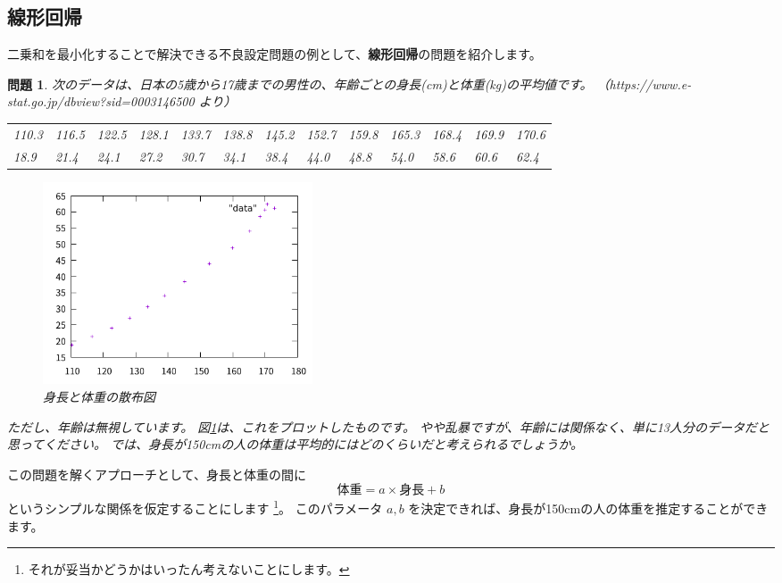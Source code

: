 \documentclass[uplatex,dvipdfmx]{jsarticle}
\newtheorem{prob}[thm]{問題}
\begin{document}
\subsection{線形回帰}
  二乗和を最小化することで解決できる不良設定問題の例として、\textbf{線形回帰}の問題を紹介します。
  \begin{prob}
    \label{prob:linear-regression}
    次のデータは、日本の5歳から17歳までの男性の、年齢ごとの身長(cm)と体重(kg)の平均値です。
    （https://www.e-stat.go.jp/dbview?sid=0003146500 より）

    \begin{table}[htb]
      \begin{tabular}{lllllllllllll}
        110.3 & 116.5 & 122.5 & 128.1 & 133.7 & 138.8 & 145.2 & 152.7 & 159.8 & 165.3 & 168.4 & 169.9 & 170.6 \\
        18.9 & 21.4 & 24.1 & 27.2 & 30.7 & 34.1 & 38.4 & 44.0 & 48.8 & 54.0 & 58.6 & 60.6 & 62.4
      \end{tabular}
    \end{table}

    \begin{figure}
      \centering
      \includegraphics[width=8cm]{scatter1.png}
      \caption{身長と体重の散布図}
      \label{scatter1}
    \end{figure}

    ただし、年齢は無視しています。
    図\ref{scatter1}は、これをプロットしたものです。
    やや乱暴ですが、年齢には関係なく、単に13人分のデータだと思ってください。
    では、身長が150cmの人の体重は平均的にはどのくらいだと考えられるでしょうか。
  \end{prob}

  この問題を解くアプローチとして、身長と体重の間に
  \begin{equation}
    \label{linear-correspondence}
    \mbox{体重} = a \times \mbox{身長} + b
  \end{equation}
  というシンプルな関係を仮定することにします
  \footnote{それが妥当かどうかはいったん考えないことにします。}。
  このパラメータ $a, b$ を決定できれば、身長が150cmの人の体重を推定することができます。
\end{document}
